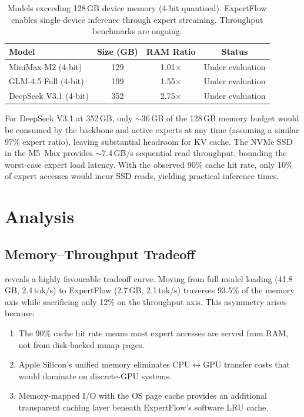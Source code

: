 \documentclass[11pt,a4paper]{article}
\begin{document}
\begin{table}[t]
\centering
\caption{Models exceeding 128\,GB device memory (4-bit quantised).
  ExpertFlow enables single-device inference through expert streaming.
  Throughput benchmarks are ongoing.}
\label{tab:beyond-ram}
\begin{tabular}{lccc}
\toprule
\textbf{Model} & \textbf{Size (GB)} & \textbf{RAM Ratio} &
  \textbf{Status} \\
\midrule
MiniMax-M2 (4-bit)       & 129 & 1.01$\times$ & Under evaluation \\
GLM-4.5 Full (4-bit)     & 199 & 1.55$\times$ & Under evaluation \\
DeepSeek V3.1 (4-bit)    & 352 & 2.75$\times$ & Under evaluation \\
\bottomrule
\end{tabular}
\end{table}

For DeepSeek V3.1 at 352\,GB, only $\sim$36\,GB of the 128\,GB memory budget
would be consumed by the backbone and active experts at any time (assuming a
similar 97\% expert ratio), leaving substantial headroom for KV cache. The
NVMe SSD in the M5~Max provides $\sim$7.4\,GB/s sequential read throughput,
bounding the worst-case expert load latency. With the observed 90\% cache hit
rate, only 10\% of expert accesses would incur SSD reads, yielding practical
inference times.

\section{Analysis}
\label{sec:analysis}

\subsection{Memory--Throughput Tradeoff}
\label{sec:analysis:tradeoff}

 reveals a highly favourable tradeoff curve. Moving
from full model loading (41.8\,GB, 2.4\,tok/s) to ExpertFlow (2.7\,GB,
2.1\,tok/s) traverses 93.5\% of the memory axis while sacrificing only 12\%
on the throughput axis. This asymmetry arises because:
\begin{enumerate}[nosep]
  \item The 90\% cache hit rate means most expert accesses are served from
    RAM, not from disk-backed mmap pages.
  \item Apple Silicon's unified memory eliminates CPU$\leftrightarrow$GPU
    transfer costs that would dominate on discrete-GPU systems.
  \item Memory-mapped I/O with the OS page cache provides an additional
    transparent caching layer beneath ExpertFlow's software LRU cache.
\end{enumerate}
\end{document}
